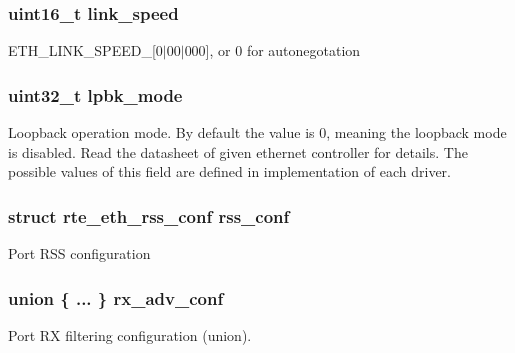 \subsubsection[{link\+\_\+speed}]{\setlength{\rightskip}{0pt plus 5cm}uint16\+\_\+t link\+\_\+speed}\label{structrte__eth__conf_a7d93770cafbfd72bb3bbd1aaec9894ab}
E\+T\+H\+\_\+\+L\+I\+N\+K\+\_\+\+S\+P\+E\+E\+D\+\_\mbox{[}0$\vert$00$\vert$000\mbox{]}, or 0 for autonegotation \hypertarget{structrte__eth__conf_a51fd0c5d4c2366abf95f7364accf3143}{}
\subsubsection[{lpbk\+\_\+mode}]{\setlength{\rightskip}{0pt plus 5cm}uint32\+\_\+t lpbk\+\_\+mode}\label{structrte__eth__conf_a51fd0c5d4c2366abf95f7364accf3143}
Loopback operation mode. By default the value is 0, meaning the loopback mode is disabled. Read the datasheet of given ethernet controller for details. The possible values of this field are defined in implementation of each driver. \hypertarget{structrte__eth__conf_addc9c7bb19ed12f1171c543493553806}{}
\subsubsection[{rss\+\_\+conf}]{\setlength{\rightskip}{0pt plus 5cm}struct {\bf rte\+\_\+eth\+\_\+rss\+\_\+conf} rss\+\_\+conf}\label{structrte__eth__conf_addc9c7bb19ed12f1171c543493553806}
Port R\+S\+S configuration \hypertarget{structrte__eth__conf_a4b3455eec163a36fdeda31b65143428b}{}
\subsubsection[{rx\+\_\+adv\+\_\+conf}]{\setlength{\rightskip}{0pt plus 5cm}union \{ ... \}   rx\+\_\+adv\+\_\+conf}\label{structrte__eth__conf_a4b3455eec163a36fdeda31b65143428b}
Port R\+X filtering configuration (union). \hypertarget{structrte__eth__conf_a346eef99c24f617b74c440c1aa565d01}{}
